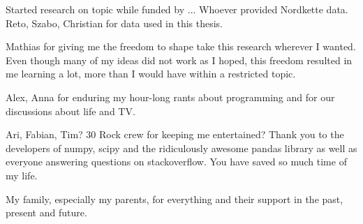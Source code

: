 Started research on topic while funded by ... Whoever provided Nordkette data.
Reto, Szabo, Christian for data used in this thesis.

Mathias for giving me the freedom to shape take this research wherever
I wanted. Even though many of my ideas did not work as I hoped, this freedom
resulted in me learning a lot, more than I would have within a restricted
topic.

Alex, Anna for enduring my hour-long rants about programming and for our
discussions about life and TV.

Ari, Fabian, Tim? 30 Rock crew for keeping me entertained? Thank you to the
developers of numpy, scipy and the ridiculously awesome pandas library as well
as everyone answering questions on stackoverflow. You have saved so much time
of my life.

My family, especially my parents, for everything and their support in the past,
present and future.

